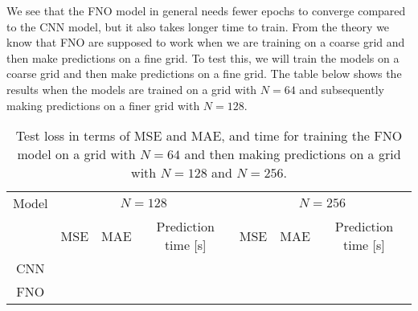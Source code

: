 We see that the FNO model in general needs fewer epochs to converge compared to the CNN model, but it also takes longer time to train.
From the theory we know that FNO are supposed to work when we are training on a coarse grid and then make predictions on a fine grid.
To test this, we will train the models on a coarse grid and then make predictions on a fine grid.
The table below shows the results when the models are trained on a grid with $N = 64$ and subsequently making predictions on a finer grid with $N = 128$.

\begin{table}[H]
    \centering
    \begin{tabular}{c|ccc|ccc}
        Model & \multicolumn{3}{c}{$N = 128$} & \multicolumn{3}{c}{$N = 256$} \\
        \cline{2-7}
        & MSE & MAE & Prediction time [s] & MSE & MAE & Prediction time [s] \\
        \hline
        CNN &
         &
         &
         &
         &
         &
         \\ \hline
        FNO  &
         &
         &
         &
         &
         &
         \\
    \end{tabular}
    \caption{Test loss in terms of MSE and MAE, and time for training the FNO model on a grid with $N = 64$ and then making predictions on a grid with $N = 128$ and $N=256$.}\label{tab:results_2D_train_64_test_128_256}
\end{table}
